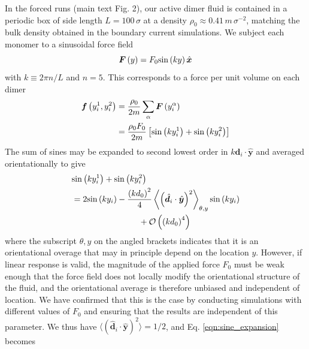 \documentclass[%
 reprint,
superscriptaddress,
longbibliography,
 amsmath,amssymb,
 prl,
 citeautoscript,
]{revtex4-1}
\begin{document}
In the forced runs (main text Fig. 2), our active dimer fluid is contained in a periodic box of side length $L = 100 \, \sigma$ at a density $\rho_0 \approx 0.41 \, m \, \sigma^{-2}$, matching the bulk density obtained in the boundary current simulations. We subject each monomer to a sinusoidal force field
\begin{equation}
{\boldsymbol F} \left( y \right) = F_0 {\rm sin} \left( k y \right) \hat{\boldsymbol x}
\label{eqn:force_field_monomer}
\end{equation}
with $k \equiv 2 \pi n / L$ and $n = 5$. This corresponds to a force per unit volume on each dimer
\begin{equation}
\begin{split}
{\boldsymbol f} \left( y_i^1, y_i^2 \right) &= \frac{\rho_0}{2 m} \sum_{\alpha} {\boldsymbol F} \left( y_i^{\alpha} \right) \\
&= \frac{\rho_0 F_0}{2 m} \left[ {\rm sin} \left( k y_i^1 \right) + {\rm sin} \left( k y_i^2 \right) \right]
\end{split}
\label{eqn:force_field_hydrodynamic_initial}
\end{equation}
The sum of sines may be expanded to second lowest order in $k {\boldsymbol d}_i \cdot \hat{\boldsymbol y}$ and averaged orientationally to give
\begin{equation}
\begin{split}
&{\rm sin} \left( k y_i^1 \right) + {\rm sin} \left( k y_i^2 \right) \\
&= 2 {\rm sin} \left( k y_i \right) - \frac{\left( k d_0 \right)^2}{4} \left\langle \left( \hat{\boldsymbol d}_i \cdot \hat{\boldsymbol y} \right)^2 \right\rangle_{\theta,y} {\rm sin} \left( k y_i \right) \\
& \quad \quad \quad \quad \quad \quad \quad \quad+ \mathcal{O} \left( \left( kd_0 \right)^4 \right)
\end{split}
\label{eqn:sine_expansion}
\end{equation}
where the subscript $\theta,y$ on the angled brackets indicates that it is an orientational overage that may in principle depend on the location $y$. However, if linear response is valid, the magnitude of the applied force $F_0$ must be weak enough that the force field does not locally modify the orientational structure of the fluid, and the orientational average is therefore unbiased and independent of location. We have confirmed that this is the case by conducting simulations with different values of $F_0$ and ensuring that the results are independent of this parameter. We thus have $\langle (\hat{\boldsymbol d}_i \cdot \hat{\boldsymbol y})^2 \rangle = 1/2$, and Eq. \ref{eqn:sine_expansion} becomes
\end{document}
